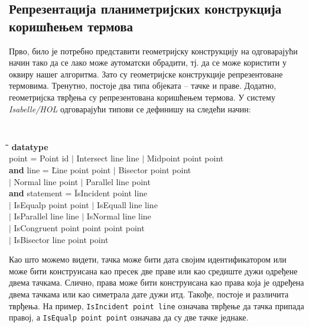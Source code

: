 \subsection{Репрезентација планиметријских конструкција коришћењем термова}

Прво, било је потребно представити геометријску конструкцију на
одговарајући начин тако да се лако може аутоматски обрадити, тј. да се
може користити у оквиру нашег алгоритма. Зато су геометријске
конструкције репрезентоване термовима. Тренутно, постоје два типа
објеката -- тачке и праве. Додатно, геометријска тврђења су
репрезентована коришћењем термова. У систему \emph{Isabelle/HOL}
одговарајући типови се дефинишу на следећи начин:

\begin{small}
 {\tt
  \begin{tabbing}
    \hspace{5mm}\=\hspace{5mm}\=\hspace{5mm}\=\hspace{5mm}\=\hspace{5mm}\=\kill
\textbf{data}\=\textbf{type} \\
    \> point = Point id  $|$ Intersect line line $|$ Midpoint point point \\ 

\textbf{and} line = \= Line point point  $|$ Bisector point point \\
          \>\>\>     $|$ Normal line point $|$ Parallel line point \\

\textbf{and} statement = \= IsIncident point line \\
          \>\>\> $|$ IsEqualp point point  $|$ IsEquall line line \\
          \>\>\> $|$ IsParallel line line  $|$ IsNormal line line \\
          \>\>\> $|$ IsCongruent point point point point \\
          \>\>\> $|$ IsBisector line point point
\end{tabbing}
}
\end{small}

Као што можемо видети, тачка може бити дата својим идентификатором или
може бити конструисана као пресек две праве или као средиште дужи
одређене двема тачкама. Слично, права може бити конструисана као права
која је одређена двема тачкама или као симетрала дате дужи
итд. Такође, постоје и различита тврђења. На пример, {\tt IsIncident
  point line} означава тврђење да тачка припада правој, а {\tt IsEqualp
  point point} означава да су две тачке једнаке. \\


